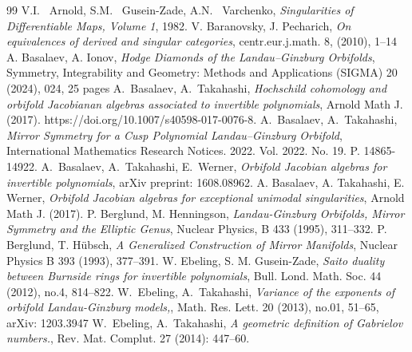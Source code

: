 \documentclass[reqno,12pt]{amsart}
\numberwithin{equation}{section}
\theoremstyle{plain}
\newtheorem{corollary}[theorem]{Corollary}
\theoremstyle{definition}
\begin{document}



\begin{thebibliography}{99}
     V.I. ~Arnold, S.M. ~Gusein-Zade, A.N. ~Varchenko, \emph{Singularities of Differentiable Maps, Volume 1}, 1982.
     V. Baranovsky, J. Pecharich, \emph{On equivalences of derived and singular categories},  centr.eur.j.math. 8, (2010), 1–14
     A. Basalaev, A. Ionov, \emph{Hodge Diamonds of the Landau–Ginzburg Orbifolds}, Symmetry, Integrability and Geometry: Methods and Applications (SIGMA) 20 (2024), 024, 25 pages 
	A.~Basalaev, A.~Takahashi, \emph{Hochschild cohomology and orbifold Jacobianan algebras associated to invertible polynomials}, Arnold Math J. (2017). https://doi.org/10.1007/s40598-017-0076-8.
	A.~Basalaev, A.~Takahashi, \emph{Mirror Symmetry for a Cusp Polynomial Landau–Ginzburg Orbifold}, International Mathematics Research Notices. 2022. Vol. 2022. No. 19. P. 14865-14922.
	A.~Basalaev, A.~Takahashi, E.~Werner, \emph{Orbifold Jacobian algebras for invertible polynomials}, arXiv preprint: 1608.08962.
    A. Basalaev, A. Takahashi, E. Werner, \emph{Orbifold Jacobian algebras for exceptional unimodal singularities}, Arnold Math J. (2017).
    P. Berglund, M. Henningson, \emph{Landau-Ginzburg Orbifolds, Mirror Symmetry and the Elliptic Genus}, Nuclear Physics, B 433 (1995), 311–332.
    P. Berglund, T. Hübsch, \emph{A Generalized Construction of Mirror Manifolds}, Nuclear Physics B 393 (1993), 377–391.
    W. Ebeling, S. M. Gusein-Zade, \emph{Saito duality between Burnside rings for invertible polynomials}, Bull. Lond. Math. Soc. 44 (2012), no.4, 814–822. 
	W.~Ebeling, A.~Takahashi, \emph{Variance of the exponents of orbifold Landau-Ginzburg models,}, Math. Res. Lett. 20 (2013), no.01, 51–65, arXiv: 1203.3947
	W.~Ebeling, A.~Takahashi, \emph{A geometric definition of Gabrielov numbers.}, Rev. Mat. Complut. 27 (2014): 447–60.


\end{thebibliography}
\end{document}
